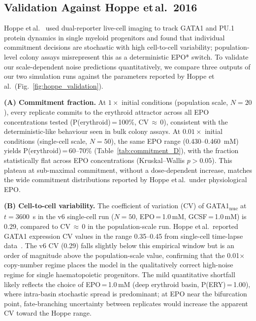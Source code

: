 \subsection{Validation Against Hoppe et\,al.\ 2016}

Hoppe et\,al.~\cite{hoppe2016} used dual-reporter live-cell imaging to track GATA1 and PU.1 protein dynamics in single myeloid progenitors and found that individual commitment decisions are stochastic with high cell-to-cell variability; population-level colony assays misrepresent this as a deterministic EPO* switch. To validate our scale-dependent noise predictions quantitatively, we compare three outputs of our two simulation runs against the parameters reported by Hoppe et\,al.\ (Fig.~\ref{fig:hoppe_validation}).

\textbf{(A) Commitment fraction.}
At $1\times$ initial conditions (population scale, $N=20$), every replicate commits to the erythroid attractor across all EPO concentrations tested (P(erythroid)\,=\,100\%, CV\,$\approx$\,0), consistent with the deterministic-like behaviour seen in bulk colony assays. At $0.01\times$ initial conditions (single-cell scale, $N=50$), the same EPO range (0.430--0.460~mM) yields P(erythroid)\,=\,60--70\% (Table~\ref{tab:commitment_D}), with the fraction statistically flat across EPO concentrations (Kruskal--Wallis $p>0.05$). This plateau at sub-maximal commitment, without a dose-dependent increase, matches the wide commitment distributions reported by Hoppe et\,al.\ under physiological EPO.

\textbf{(B) Cell-to-cell variability.}
The coefficient of variation (CV) of GATA1\textsubscript{nuc} at $t=3600$~s in the v6 single-cell run ($N=50$, EPO\,=\,1.0\,mM, GCSF\,=\,1.0\,mM) is 0.29, compared to CV\,$\approx$\,0 in the population-scale run. Hoppe et\,al.\ reported GATA1 expression CV values in the range 0.35--0.45 from single-cell time-lapse data~\cite{hoppe2016}. The v6 CV (0.29) falls slightly below this empirical window but is an order of magnitude above the population-scale value, confirming that the 0.01$\times$ copy-number regime places the model in the qualitatively correct high-noise regime for single haematopoietic progenitors. The mild quantitative shortfall likely reflects the choice of EPO\,=\,1.0\,mM (deep erythroid basin, P(ERY)\,=\,1.00), where intra-basin stochastic spread is predominant; at EPO near the bifurcation point, fate-branching uncertainty between replicates would increase the apparent CV toward the Hoppe range.


